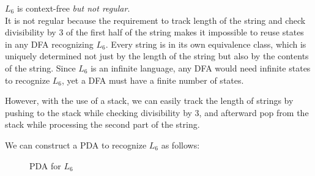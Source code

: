 \begin{Answer}
  $L_6$ is context-free \emph{but not regular}.\\
  It is not regular because the requirement to track length of the string
  and check divisibility by $3$ of the first half of the string
  makes it impossible to reuse states in any DFA recognizing $L_6$.
  Every string is in its own equivalence class,
  which is uniquely determined not just by the length of the string
  but also by the contents of the string.
  Since $L_6$ is an infinite language, any DFA
  would need infinite states to recognize $L_6$,
  yet a DFA must have a finite number of states.

  \step
  However, with the use of a stack, we can easily track the length of
  strings by pushing to the stack while checking divisibility by $3$,
  and afterward pop from the stack while processing the second part of
  the string.
  
  \step
  We can construct a PDA to recognize $L_6$ as follows:
  \begin{figure}[H]
    \centering
    \caption{PDA for $L_6$}
  \end{figure}


\end{Answer}
